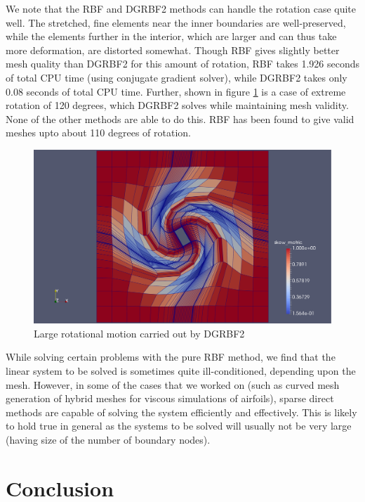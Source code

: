 \documentclass[letterpaper,11pt]{article}
\begin{document}
We note that the RBF and DGRBF2 methods can handle the rotation case quite well. The stretched, fine elements near the inner boundaries are well-preserved, while the elements further in the interior, which are larger and can thus take more deformation, are distorted somewhat. Though RBF gives slightly better mesh quality than DGRBF2 for this amount of rotation, RBF takes 1.926 seconds of total CPU time (using conjugate gradient solver), while DGRBF2 takes only 0.08 seconds of total CPU time. Further, shown in figure \ref{fig:qin-dgrbf2-120} is a case of extreme rotation of 120 degrees, which DGRBF2 solves while maintaining mesh validity. None of the other methods are able to do this. RBF has been found to give valid meshes upto about 110 degrees of rotation.
\begin{figure}
	\centering
	\includegraphics[scale=0.25]{qin-120-quality-withmesh.pdf}
	\caption{Large rotational motion carried out by DGRBF2}
	\label{fig:qin-dgrbf2-120}
\end{figure}

While solving certain problems with the pure RBF method, we find that the linear system to be solved is sometimes quite ill-conditioned, depending upon the mesh. However, in some of the cases that we worked on (such as curved mesh generation of hybrid meshes for viscous simulations of airfoils), sparse direct methods are capable of solving the system efficiently and effectively. This is likely to hold true in general as the systems to be solved will usually not be very large (having size of the number of boundary nodes).

\FloatBarrier

\section{Conclusion}
\end{document}

